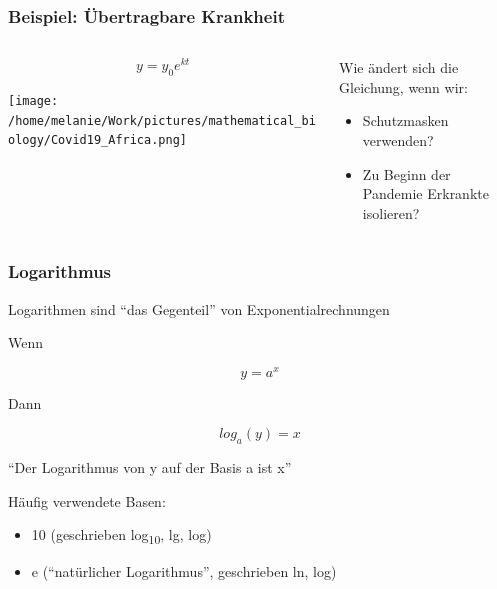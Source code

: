 \documentclass{beamer}
\begin{document}
\begin{frame}
\frametitle{Beispiel: Übertragbare Krankheit}

\begin{columns}[c]
\begin{column}{5cm}

\[
y = y_0 e^{kt}
\] 


\begin{center}

\texttt{[image: /home/melanie/Work/pictures/mathematical\_biology/Covid19\_Africa.png]}
\end{center}



\end{column}
\begin{column}{5cm}

Wie ändert sich die Gleichung, wenn wir:

\begin{itemize}
\item
Schutzmasken verwenden? 
\item
Zu Beginn der Pandemie Erkrankte isolieren?
\end{itemize}


\end{column}
\end{columns}


\end{frame}



\begin{frame}
\frametitle{Logarithmus}

Logarithmen sind ``das Gegenteil'' von Exponentialrechnungen

Wenn 

\[
y = a^x
\]

Dann

\[
log_a(y) = x
\]


``Der Logarithmus von y auf der Basis a ist x'' 


\pause

Häufig verwendete Basen: 

\begin{itemize}
\item
10 (geschrieben log\textsubscript{10}, lg, log)
\item
e (``natürlicher Logarithmus'', geschrieben ln, log)
\end{itemize}

\end{frame}
\end{document}
